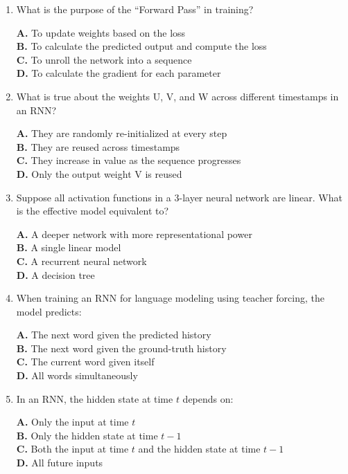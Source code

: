 \documentclass[11pt]{article}
\begin{document}
\begin{enumerate}[label=Q\arabic*., leftmargin=*]
\item What is the purpose of the ``Forward Pass'' in training?

\textbf{A.} To update weights based on the loss\\
\textbf{B.} To calculate the predicted output and compute the loss\\
\textbf{C.} To unroll the network into a sequence\\
\textbf{D.} To calculate the gradient for each parameter

\item What is true about the weights U, V, and W across different timestamps in an RNN?

\textbf{A.} They are randomly re-initialized at every step\\
\textbf{B.} They are reused across timestamps\\
\textbf{C.} They increase in value as the sequence progresses\\
\textbf{D.} Only the output weight V is reused

\item Suppose all activation functions in a 3-layer neural network are linear. What is the effective model equivalent to?

\textbf{A.} A deeper network with more representational power\\
\textbf{B.} A single linear model\\
\textbf{C.} A recurrent neural network\\
\textbf{D.} A decision tree

\item When training an RNN for language modeling using teacher forcing, the model predicts:

\textbf{A.} The next word given the predicted history\\
\textbf{B.} The next word given the ground-truth history\\
\textbf{C.} The current word given itself\\
\textbf{D.} All words simultaneously

\item In an RNN, the hidden state at time $t$ depends on:

\textbf{A.} Only the input at time $t$\\
\textbf{B.} Only the hidden state at time $t-1$\\
\textbf{C.} Both the input at time $t$ and the hidden state at time $t-1$\\
\textbf{D.} All future inputs


\end{enumerate}
\end{document}
